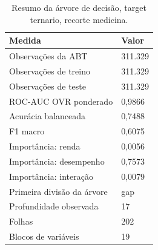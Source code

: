 \begin{table}
\caption{Resumo da árvore de decisão, target ternario, recorte medicina.}
\label{tab:tabela_treeClassification_ternario_recorte_medicina_principal_in_sample_e5}
\begin{tabular}{ll}
\toprule
Medida & Valor \\
\midrule
Observações da ABT & 311.329 \\
Observações de treino & 311.329 \\
Observações de teste & 311.329 \\
ROC-AUC OVR ponderado & 0,9866 \\
Acurácia balanceada & 0,7488 \\
F1 macro & 0,6075 \\
Importância: renda & 0,0056 \\
Importância: desempenho & 0,7573 \\
Importância: interação & 0,0079 \\
Primeira divisão da árvore & gap \\
Profundidade observada & 17 \\
Folhas & 202 \\
Blocos de variáveis & 19 \\
\bottomrule
\end{tabular}
\end{table}
